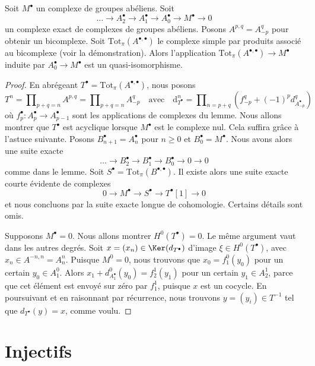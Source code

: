\begin{lemma}
\label{lemma-resolution-gives-qis}
Soit $M^\bullet$ un complexe de groupes abéliens. Soit
$$
\ldots \to A_2^\bullet \to A_1^\bullet \to A_0^\bullet \to M^\bullet \to 0
$$
un complexe exact de complexes de groupes abéliens. Posons
$A^{p, q} = A_{-p}^q$ pour obtenir un bicomplexe. Soit
$\text{Tot}_\pi(A^{\bullet, \bullet})$
le complexe simple par produits associé au bicomplexe (voir la démonstration).
Alors l'application $\text{Tot}_\pi(A^{\bullet, \bullet}) \to M^\bullet$
induite par $A_0^\bullet \to M^\bullet$ est un quasi-isomorphisme.
\end{lemma}

\begin{proof}
En abrégeant $T^\bullet = \text{Tot}_\pi(A^{\bullet, \bullet})$,
nous posons
$$
T^n = \prod\nolimits_{p + q = n} A^{p, q} =
\prod\nolimits_{p + q = n} A_{-p}^q
\quad\text{avec}\quad
\text{d}_{T^\bullet}^n =
\prod\nolimits_{n = p + q} (f_{-p}^q + (-1)^pd_{A_{-p}^\bullet}^q)
$$
où $f_p^\bullet : A_p^\bullet \to A_{p - 1}^\bullet$
sont les applications de complexes du lemme.
Nous allons montrer que $T^\bullet$ est acyclique lorsque
$M^\bullet$ est le complexe nul. Cela suffira grâce à l'astuce suivante.
Posons $B_{n + 1}^\bullet = A_n^\bullet$ pour $n \geq 0$
et $B_0^\bullet = M^\bullet$. Nous avons alors une suite exacte
$$
\ldots \to B_2^\bullet \to B_1^\bullet \to B_0^\bullet \to 0 \to 0
$$
comme dans le lemme. Soit $S^\bullet = \text{Tot}_\pi(B^{\bullet, \bullet})$.
Il existe alors une suite exacte courte évidente de complexes
$$
0 \to M^\bullet \to S^\bullet \to T^\bullet[1] \to 0
$$
et nous concluons par la suite exacte longue de cohomologie. Certains
détails sont omis.

\medskip\noindent
Supposons $M^\bullet = 0$. Nous allons montrer $H^0(T^\bullet) = 0$. Le même
argument vaut dans les autres degrés. Soit
$x =(x_n) \in \Ker(d_{T^\bullet})$ d'image $\xi \in H^0(T^\bullet)$,
avec $x_n \in A^{-n, n} = A_n^n$.
Puisque $M^0 = 0$, nous trouvons que $x_0 = f_1^0(y_0)$ pour un certain
$y_0 \in A_1^0$.
Alors $x_1 + d^0_{A_1^\bullet}(y_0) = f_2^1(y_1)$ pour un certain
$y_1 \in A_2^1$, parce que cet élément est envoyé sur zéro par $f_1^1$,
puisque $x$ est un cocycle. En poursuivant et en raisonnant
par récurrence, nous trouvons
$y = (y_i) \in T^{-1}$ tel que $d_{T^\bullet}(y) = x$, comme voulu.
\end{proof}

\section{Injectifs}
\label{section-injectives}

